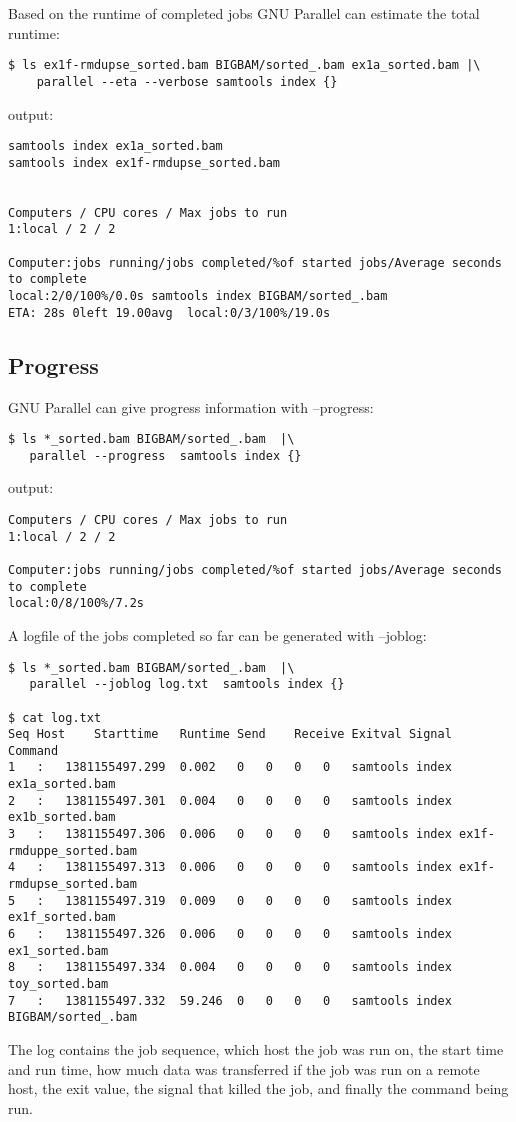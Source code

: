 \documentclass{article}
\begin{document}
Based on the runtime of completed jobs GNU Parallel can estimate the total runtime:
\begin{lstlisting}
$ ls ex1f-rmdupse_sorted.bam BIGBAM/sorted_.bam ex1a_sorted.bam |\
	parallel --eta --verbose samtools index {} 
\end{lstlisting}
output:
\begin{lstlisting}
samtools index ex1a_sorted.bam
samtools index ex1f-rmdupse_sorted.bam


Computers / CPU cores / Max jobs to run
1:local / 2 / 2

Computer:jobs running/jobs completed/%of started jobs/Average seconds to complete
local:2/0/100%/0.0s samtools index BIGBAM/sorted_.bam
ETA: 28s 0left 19.00avg  local:0/3/100%/19.0s 
\end{lstlisting}


\subsection{Progress}
GNU Parallel can give progress information with --progress:
\begin{lstlisting}
$ ls *_sorted.bam BIGBAM/sorted_.bam  |\
   parallel --progress  samtools index {}
\end{lstlisting}
output:
\begin{lstlisting}
Computers / CPU cores / Max jobs to run
1:local / 2 / 2

Computer:jobs running/jobs completed/%of started jobs/Average seconds to complete
local:0/8/100%/7.2s 
\end{lstlisting}

A logfile of the jobs completed so far can be generated with --joblog:
\begin{lstlisting}
$ ls *_sorted.bam BIGBAM/sorted_.bam  |\
   parallel --joblog log.txt  samtools index {}

$ cat log.txt
Seq	Host	Starttime	Runtime	Send	Receive	Exitval	Signal	Command
1	:	1381155497.299	0.002	0	0	0	0	samtools index ex1a_sorted.bam
2	:	1381155497.301	0.004	0	0	0	0	samtools index ex1b_sorted.bam
3	:	1381155497.306	0.006	0	0	0	0	samtools index ex1f-rmduppe_sorted.bam
4	:	1381155497.313	0.006	0	0	0	0	samtools index ex1f-rmdupse_sorted.bam
5	:	1381155497.319	0.009	0	0	0	0	samtools index ex1f_sorted.bam
6	:	1381155497.326	0.006	0	0	0	0	samtools index ex1_sorted.bam
8	:	1381155497.334	0.004	0	0	0	0	samtools index toy_sorted.bam
7	:	1381155497.332	59.246	0	0	0	0	samtools index BIGBAM/sorted_.bam
\end{lstlisting}
The log contains the job sequence, which host the job was run on, the start time and run time, how much data was transferred if the job was run on a remote host, the exit value, the signal that killed the job, and finally the command being run.
\end{document}
